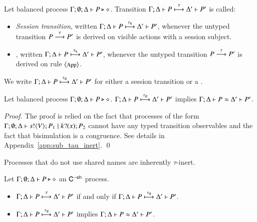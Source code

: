 \begin{definition}\rm
	Let balanced \HOp process $\Gamma; \emptyset; \Delta \vdash P \triangleright \diamond$.
	Transition $\Gamma; \Delta \vdash P \stackrel{\tau}{\longmapsto} \Delta' \vdash P'$ is called:
	\begin{itemize}
		\item	{\em Session transition}, written
			$\Gamma; \Delta \vdash P \stackrel{\tau_{\mathsf{s}}}{\longmapsto} \Delta' \vdash P'$,
			whenever the untyped transition $P \stackrel{\tau}{\longrightarrow} P'$
			is derived on visible actions with a session subject.

		\item	{\em \betatran}, written
			$\Gamma; \Delta \vdash P \stackrel{\tau_{\mathsf{s}}}{\longmapsto} \Delta' \vdash P'$,
			whenever the untyped transition $P \stackrel{\tau}{\longrightarrow} P'$
			is derived on rule ${\footnotesize \langle \textrm{App} \rangle}$.
	\end{itemize}
%
	We write $\Gamma; \Delta \vdash P \stackrel{\tau_{\mathsf{d}}}{\longmapsto} \Delta' \vdash P'$ for
	either a session transition or a \betatran.
\end{definition}

\begin{proposition}\rm
	\label{lem:tau_inert}
	Let balanced \HOp process $\Gamma; \emptyset; \Delta \vdash P \triangleright \diamond$.
	$\Gamma; \Delta \vdash P \stackrel{\tau_{\mathsf{d}}}{\longmapsto} \Delta' \vdash P'$ implies
	$\Gamma; \Delta \vdash P \approx \Delta' \vdash P'$.
\end{proposition}

\begin{proof}
	The proof is relied on the fact that processes of the
	form $\Gamma; \emptyset; \Delta \vdash s ! \langle V \rangle ; P_1 \;|\; k ? (x) ; P_2$
	cannot have any typed transition observables and the fact
	that bisimulation is a congruence.
	See details in Appendix~\ref{app:sub_tau_inert}.
	\qed
\end{proof}

Processes that do not use shared names are inherently $\tau$-inert.

\begin{corollary}\rm
	\label{cor:tau_inert}
	Let $\Gamma; \emptyset; \Delta \vdash P \triangleright \diamond$ an $\mathsf{C}^{\mathsf{-sh}}$ process.
%
	\begin{itemize}
		\item	$\Gamma; \Delta \vdash P \stackrel{\tau}{\longmapsto} \Delta' \vdash P'$ if and only if $\Gamma; \Delta \vdash P \stackrel{\tau_{\mathsf{d}}}{\longmapsto} \Delta' \vdash P'$.
		\item	$\Gamma; \Delta \vdash P \stackrel{\tau_{\mathsf{d}}}{\longmapsto} \Delta' \vdash P'$ implies $\Gamma; \Delta \vdash P \approx \Delta' \vdash P'$.
	\end{itemize}
\end{corollary}

